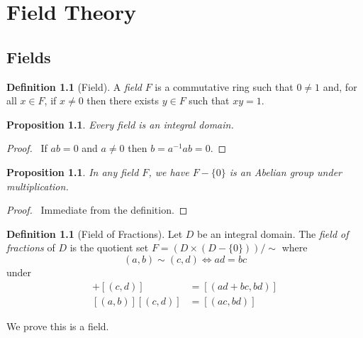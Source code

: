 \documentclass{book}
\let\qed\relax
\newtheorem{prop}[ax]{Proposition}
\theoremstyle{definition}
\newtheorem{df}[ax]{Definition}
\begin{document}
\chapter{Field Theory}

\section{Fields}

\begin{df}[Field]
A \emph{field} $F$ is a commutative ring such that $0 \neq 1$ and, for all $x \in F$, if $x \neq 0$ then there exists $y \in F$ such that $xy = 1$.
\end{df}

\begin{prop}
Every field is an integral domain.
\end{prop}

\begin{proof}
\pf\ If $ab = 0$ and $a \neq 0$ then $b = a^{-1}ab = 0$. \qed
\end{proof}

\begin{prop}
In any field $F$, we have $F - \{0\}$ is an Abelian group under multiplication.
\end{prop}

\begin{proof}
\pf\ Immediate from the definition. \qed
\end{proof}

\begin{df}[Field of Fractions]
Let $D$ be an integral domain. The \emph{field of fractions} of $D$ is the quotient set $F = (D \times (D - \{0\})) / \sim$ where
\[ (a,b) \sim (c,d) \Leftrightarrow ad = bc \]
under
\begin{align*}
[(a,b)] + [(c,d)] & = [(ad+bc,bd)] \\
[(a,b)][(c,d)] & = [(ac,bd)]
\end{align*}

We prove this is a field.
\end{df}
\end{document}
